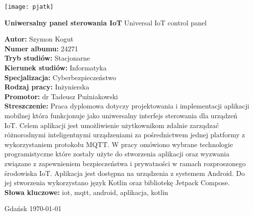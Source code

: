 \thispagestyle{empty}

\vspace*{2em}

\begin{center}
    \texttt{[image: pjatk]}
\end{center}

\vspace{2em}

\begin{center}
    \huge
    \textbf{Uniwersalny panel sterowania IoT}
    \Large
    Universal IoT control panel
\end{center}

\vspace{4em}

\textbf{Autor:} Szymon Kogut\\
\textbf{Numer albumu:} 24271\\

\textbf{Tryb studiów:} Stacjonarne\\
\textbf{Kierunek studiów:} Informatyka\\
\textbf{Specjalizacja:} Cyberbezpieczeństwo\\

\textbf{Rodzaj pracy:} Inżynierska\\
\textbf{Promotor:} dr Tadeusz Puźniakowski\\

\textbf{Streszczenie:}
Praca dyplomowa dotyczy projektowania i implementacji aplikacji mobilnej która funkcjonuje jako uniwersalny interfejs sterowania dla urządzeń IoT. Celem aplikacji jest umożliwienie użytkownikom zdalnie zarządzać różnorodnymi inteligentnymi urządzeniami za pośrednictwem jednej platformy z wykorzystaniem protokołu MQTT. W pracy omówiono wybrane technologie programistyczne które zostały użyte do stworzenia aplikacji oraz wyzwania związane z zapewnieniem bezpieczeństwa i prywatności w ramach rozproszonego środowiska IoT. Aplikacja jest dostępna na urządzenia z systemem Android. Do jej stworzenia wykorzystano język Kotlin oraz bibliotekę Jetpack Compose.\\

\textbf{Słowa kluczowe:} iot, mqtt, android, aplikacja, kotlin

\vfill

\begin{center}
    Gdańsk \today
\end{center}